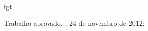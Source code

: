 fgt\documentclass[12pt, %
openright, 
oneside, %
a4paper,    %
brazil]{facom-ufu-abntex2}
\begin{document}
\frenchspacing 

\imprimircapa
\imprimirfolhaderosto


%
%
\begin{folhadeaprovacao}

  \begin{center}
    {\ABNTEXchapterfont\large\imprimirautor}

    \vspace*{\fill}\vspace*{\fill}
    {\ABNTEXchapterfont\bfseries\Large\imprimirtitulo}
    \vspace*{\fill}
    
    \hspace{.45\textwidth}
    \begin{minipage}{.5\textwidth}
        \imprimirpreambulo
    \end{minipage}%
    \vspace*{\fill}
   \end{center}
    
   Trabalho aprovado. \imprimirlocal, 24 de novembro de 2012: %

      
   \begin{center}
    \vspace*{0.5cm}
    {\large\imprimirlocal}
    \par
    {\large\imprimirdata}
    \vspace*{1cm}
  \end{center}
  
\end{folhadeaprovacao}


\end{document}
